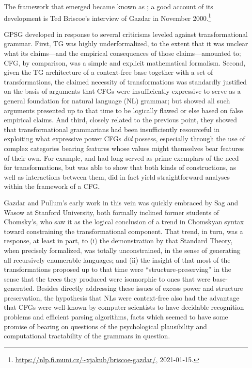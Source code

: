 \documentclass[output=paper
 	        ,biblatex
                ,babelshorthands
                ,newtxmath
                ,draftmode
                ,colorlinks, citecolor=brown
]{langscibook}
\begin{document}
\noindent
The framework that emerged became known as ; a good account of its development is Ted Briscoe's interview of Gazdar in November 2000.\footnote{\url{https://nlp.fi.muni.cz/~xjakub/briscoe-gazdar/}, 2021-01-15.}

GPSG developed in response to several criticisms leveled against transformational grammar. First, TG was highly underformalized, to the extent that it was unclear what its claims---and the empirical consequences of those claims---amounted to; CFG, by comparison, was a simple and explicit mathematical formalism. Second, given the TG architecture of a context-free base together with a set of transformations, the claimed necessity of transformations was standardly justified on the basis of arguments that CFGs were insufficiently expressive to serve as a general foundation for natural language (NL) grammar; but \citet{PG82a-u} showed all such arguments presented up to that time to be logically flawed or else based on false empirical claims. And third, closely related to the previous point, they showed that transformational grammarians had been insufficiently resourceful in exploiting what expressive power CFGs \emph{did} possess, especially through the use of complex categories bearing features whose values might themselves bear features of their own.  For example,  and  had long served as prime exemplars of the need for transformations, but \citet{Gazdar81a} was able to show that both kinds of constructions, as well as interactions between them, did in fact yield straightforward analyses within the framework of a CFG.
 
Gazdar and Pullum's early work in this vein was quickly embraced by Sag and Wasow at Stanford University, both formally inclined former students of Chomsky's, who saw it as the logical conclusion of a trend in Chomskyan syntax toward constraining the transformational component. That trend, in turn, was a response, at least in part, to (i) the demonstration by \citet{PR73a-u} that  Standard Theory, when precisely formalized, was totally unconstrained, in the sense of generating all recursively enumerable languages; and (ii) the insight of \citet{Emonds76a-u} that most of the transformations proposed up to that time were ``structure-preserving'' in the sense that the trees they produced were isomorphic to ones that were base-generated. Besides directly addressing these issues of excess power and structure preservation, the hypothesis that NLs were context-free also had the advantage that CFGs were well-known by computer scientists to have decidable recognition problems and efficient parsing algorithms, facts which seemed to have some promise of bearing on questions of the psychological plausibility and computational tractability of the grammars in question.
\end{document}
